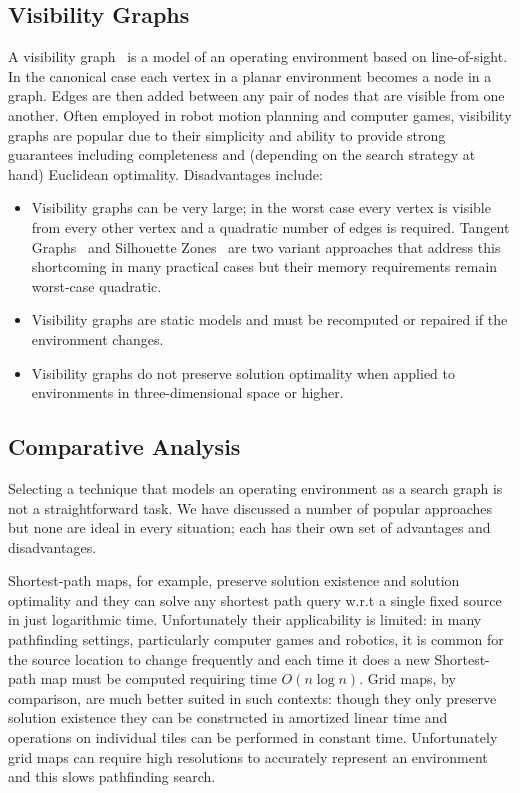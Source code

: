 \subsection{Visibility Graphs}
\label{cha::lit::graphs::vis}
A visibility graph~\citep{lozanoperez79} is a model of an operating environment based on
line-of-sight.  In the canonical case each vertex in a planar environment
becomes a node in a graph. Edges are then added between any pair of nodes that
are visible from one another.  Often employed in robot
motion planning and computer games, visibility graphs are popular due to their 
simplicity and ability to provide strong guarantees including completeness and 
(depending on the search strategy at hand) Euclidean optimality. Disadvantages 
include:
\begin{itemize}
\item Visibility graphs can be very large; in the worst case every
vertex is visible from every other vertex and a quadratic number
of edges is required. Tangent Graphs~\citep{liu92} and Silhouette Zones~\citep{young01b}
are two variant approaches that address this shortcoming in many practical
cases but their memory requirements remain worst-case quadratic.
\item Visibility graphs are static models and must be recomputed or 
repaired if the environment changes.
\item Visibility graphs do not preserve solution optimality when applied
to environments in three-dimensional space or higher.
\end{itemize}

\subsection{Comparative Analysis}
\label{cha::lit::graphs::analysis}
Selecting a technique that models an operating environment as a search graph is not
a straightforward task. We have discussed a number of popular approaches but none
are ideal in every situation; each has their own set of advantages and disadvantages.

Shortest-path maps, for example, preserve solution existence and solution optimality 
and they can solve any shortest path query w.r.t a single fixed source  in just logarithmic time. 
Unfortunately their applicability is limited: in many pathfinding settings, particularly
computer games and robotics, it is common for the source location to change frequently and
each time it does a new Shortest-path map must be computed requiring time $O(n\log{n})$.
Grid maps, by comparison, are much better suited in such contexts: though they only
preserve solution existence they can be constructed in amortized linear time and operations
on individual tiles can be performed in constant time. Unfortunately grid maps can require
high resolutions to accurately represent an environment and this slows pathfinding search.

